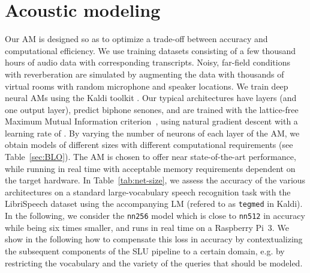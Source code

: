 \documentclass{article}
\begin{document}
\section{Acoustic modeling}
\label{sec:acoustic_model}
  
  Our AM is designed so as to optimize a trade-off between accuracy and computational efficiency. 
  We use training datasets consisting of a few thousand hours of audio data with corresponding transcripts. 
  Noisy, far-field conditions with reverberation are simulated by augmenting the data with thousands of virtual rooms with random microphone and speaker locations. 
  We train deep neural AMs using the Kaldi toolkit \cite{povey2011kaldi}. Our typical architectures have  layers (and one output layer), predict  biphone senones, and are trained with the lattice-free Maximum Mutual Information criterion~\cite{lfmmi}, using natural gradient descent with a learning rate of . 
  By varying the number of neurons of each layer of the AM, we obtain models of different sizes with different computational requirements (see Table~\ref{sec:BLO}). 
  The AM is chosen to offer near state-of-the-art performance, while running in real time with acceptable memory requirements dependent on the target hardware.
  In Table~\ref{tab:net-size}, we assess the accuracy of the various architectures on a standard large-vocabulary speech recognition task with the LibriSpeech dataset \cite{panayotov2015librispeech} using the accompanying LM (refered to as \texttt{tegmed} in Kaldi).
  In the following, we consider the \texttt{nn256} model which is close to \texttt{nn512} in accuracy while being six times smaller, and runs in real time on a Raspberry Pi~3. 
  We show in the following how to compensate this loss in accuracy by contextualizing the subsequent components of the SLU pipeline to a certain domain, e.g. by restricting the vocabulary and the variety of the queries that should be modeled.
\end{document}

